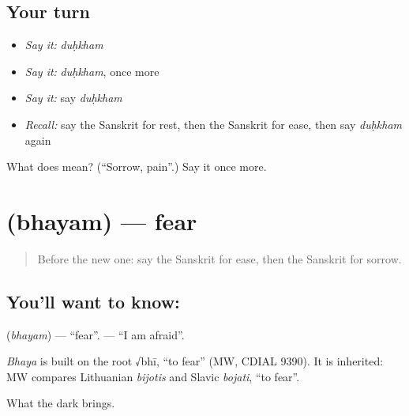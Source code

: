 \subsection*{Your turn}
\begin{itemize}
\raggedright
  \item \emph{Say it:} \emph{duḥkham}
  \item \emph{Say it:} \emph{duḥkham}, once more
  \item \emph{Say it:} say \emph{duḥkham}
  \item \emph{Recall:} say the Sanskrit for rest, then the Sanskrit for ease, then say \emph{duḥkham} again
\end{itemize}

\begin{tcolorbox}[breakable,colback=teal!4,colframe=teal!35!black,title={Before you move on}]
What does  mean? (\textquotedblleft{}Sorrow, pain\textquotedblright{}.) Say it once more.
\end{tcolorbox}
\section[\texorpdfstring{\sk{भयम्} (bhayam)}{भयम् (bhayam)}]{ (bhayam) — fear}

\label{lesson:SA-C68-fear}



\begin{quote}
Before the new one: say the Sanskrit for ease, then the Sanskrit for sorrow.
\end{quote}

\subsection*{You'll want to know: }
\textbf{} (\emph{bhayam}) — \textquotedblleft{}fear\textquotedblright{}. \textbf{  } — \textquotedblleft{}I am afraid\textquotedblright{}.

\begin{cousinweb}
\emph{Bhaya} is built on the root √bhī, \textquotedblleft{}to fear\textquotedblright{} (MW, CDIAL 9390). It is inherited: MW compares Lithuanian \emph{bijotis} and Slavic \emph{bojati}, \textquotedblleft{}to fear\textquotedblright{}.
\end{cousinweb}

\begin{grammarlens}[title={What you've built}]
What the dark brings.
\end{grammarlens}

